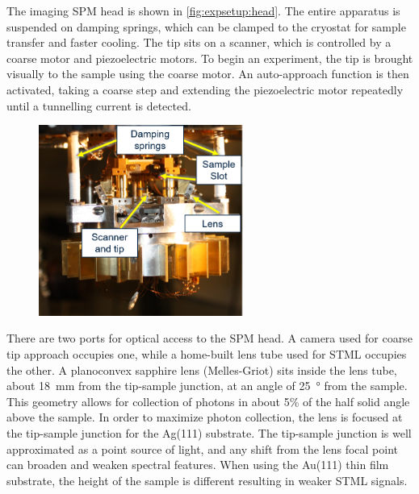 The imaging \ac{SPM} head is shown in \autoref{fig:expsetup:head}. The entire apparatus is suspended on damping springs, which can be clamped to the cryostat for sample transfer and faster cooling. The tip sits on a scanner, which is controlled by a coarse motor and piezoelectric motors. To begin an experiment, the tip is brought visually  to the sample using the coarse motor. An auto-approach function is then activated, taking a coarse step and extending the piezoelectric motor repeatedly until a tunnelling current is detected.

\begin{figure} [h]
    \centering
    \includegraphics[width=0.6\textwidth]{pictures/head.png}
    \caption{}
    \label{fig:expsetup:head}
\end{figure}

There are two ports for optical access to the \ac{SPM} head. A camera used for coarse tip approach occupies one, while a home-built lens tube used for \ac{STML} occupies the other. A planoconvex sapphire lens (Melles-Griot) sits inside the lens tube, about \SI{18}{mm} from the tip-sample junction, at an angle of \SI{25}{\degree} from the sample. This geometry allows for collection of photons in about 5\% of the half solid angle above the sample. In order to maximize photon collection, the lens is focused at the tip-sample junction for the Ag(111) substrate. The tip-sample junction is well approximated as a point source of light, and any shift from the lens focal point can broaden and weaken spectral features. When using the Au(111) thin film substrate, the height of the sample is different resulting in weaker \ac{STML} signals.

